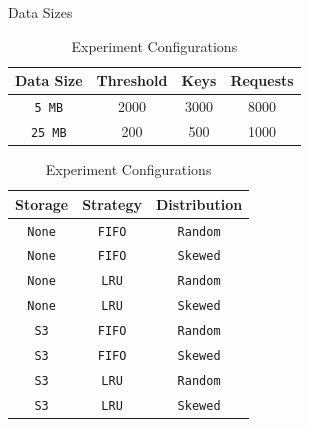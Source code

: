 \begin{table}[h]
\begin{center}
\caption{Data Sizes}
\label{tab:data_types}
\begin{tabular}{|c|c|c|c|}
  \hline
  Data Size & Threshold & Keys & Requests\\
  \hline
  {\tt 5 MB}& 2000 & 3000 & 8000\\
  {\tt 25 MB} & 200 & 500 & 1000\\
  \hline
\end{tabular}

\caption{Experiment Configurations}
\label{tab:experiment_configurations}
\begin{tabular}{|c|c|c|}
    \hline
    Storage&Strategy&Distribution\\
    \hline
    {\tt None}&{\tt FIFO}&{\tt Random}\\
    {\tt None}&{\tt FIFO}&{\tt Skewed}\\
    {\tt None}&{\tt LRU} &{\tt Random}\\
    {\tt None}&{\tt LRU} &{\tt Skewed}\\
    \hline
    {\tt S3}&{\tt FIFO}&{\tt Random}\\
    {\tt S3}&{\tt FIFO}&{\tt Skewed}\\
    {\tt S3}&{\tt LRU}&{\tt Random}\\
    {\tt S3}&{\tt LRU}&{\tt Skewed}\\
    \hline
\end{tabular}
\end{center}
\end{table}


